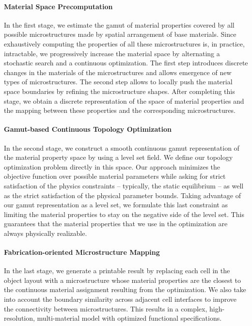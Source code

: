 \paragraph{Material Space Precomputation}
In the first stage, we estimate the gamut of material properties covered by all possible microstructures made by spatial arrangement of base materials. 
Since exhaustively computing the properties of all these microstructures is, in practice, intractable, we progressively increase the material space by alternating a stochastic search and a continuous optimization. The first step introduces discrete changes in the materials of the microstructures and allows emergence of new types of microstructures. The second step allows to locally push the material space boundaries by refining the microstructure shapes. After completing this stage, we obtain a discrete representation of the space of material properties and the mapping between these properties and the corresponding microstructures.

\paragraph{Gamut-based Continuous Topology Optimization}
In the second stage, we construct a smooth continuous gamut representation of the material property space by using a level set field. We define our topology optimization problem directly in this space. Our approach minimizes the objective function over possible material parameters while asking for strict satisfaction of the physics constraints -- typically, the static equilibrium -- as well as the strict satisfaction of the physical parameter bounds. Taking advantage of our gamut representation as a level set, we formulate this last constraint as limiting the material properties to stay on the negative side of the level set. This guarantees that the material properties that we use in the optimization are always physically realizable.

\paragraph{Fabrication-oriented Microstructure Mapping}
In the last stage, we generate a printable result by replacing each cell in the object layout with a microstructure whose material properties are the closest to the continuous material assignment resulting from the optimization. We also take into account the boundary similarity across adjacent cell interfaces to improve the connectivity between microstructures. This results in a complex, high-resolution, multi-material model with optimized functional specifications.

